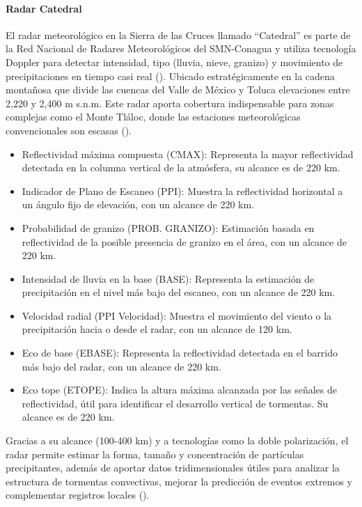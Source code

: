 \paragraph{Radar Catedral} 

El radar meteorológico en la Sierra de las Cruces llamado ``Catedral'' es parte de la Red Nacional de Radares Meteorológicos del SMN-Conagua y utiliza tecnología Doppler para detectar intensidad, tipo (lluvia, nieve, granizo) y movimiento de precipitaciones en tiempo casi real (\cite{ConaguaRadar2025}). Ubicado estratégicamente en la cadena montañosa que divide las cuencas del Valle de México y Toluca  elevaciones entre 2,220 y 2,400 m s.n.m. Este radar aporta cobertura indispensable para zonas complejas como el Monte Tláloc, donde las estaciones meteorológicas convencionales son escasas (\cite{RadarMeteoWiki2025}).

\begin{itemize}
\item Reflectividad máxima compuesta (CMAX): Representa la mayor reflectividad detectada en la columna vertical de la atmósfera, su alcance es de 220 km.
\item Indicador de Plano de Escaneo (PPI): Muestra la reflectividad horizontal a un ángulo fijo de elevación, con un alcance de 220 km.
\item Probabilidad de granizo (PROB. GRANIZO): Estimación basada en reflectividad de la posible presencia de granizo en el área, con un alcance de 220 km.
\item Intensidad de lluvia en la base (BASE): Representa la estimación de precipitación en el nivel más bajo del escaneo, con un alcance de 220 km.
\item Velocidad radial (PPI Velocidad): Muestra el movimiento del viento o la precipitación hacia o desde el radar, con un alcance de 120 km.
\item Eco de base (EBASE): Representa la reflectividad detectada en el barrido más bajo del radar, con un alcance de 220 km.
\item Eco tope (ETOPE): Indica la altura máxima alcanzada por las señales de reflectividad, útil para identificar el desarrollo vertical de tormentas. Su alcance es de 220 km.
\end{itemize}

Gracias a su alcance (100-400 km) y a tecnologías como la doble polarización, el radar permite estimar la forma, tamaño y concentración de partículas precipitantes, además de aportar datos tridimensionales útiles para analizar la estructura de tormentas convectivas, mejorar la predicción de eventos extremos y complementar registros locales (\cite{GarciaPalomo2008}). 



